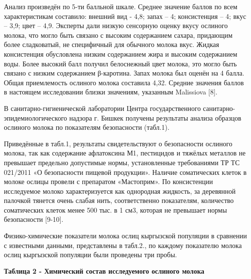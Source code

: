 \begin{multicols}{2}
Анализ произведён по 5-ти балльной шкале. Среднее значение баллов по
всем характеристикам составило: внешний вид - 4,8; запах -- 4;
консистенция -- 4; вкус -- 3,9; цвет -- 4,9. Эксперты дали низкую
сенсорную оценку вкусу ослиного молока, что могло быть связано с высоким
содержанием сахара, придающим более сладковатый, не специфичный для
обычного молока вкус. Жидкая консистенция обусловлена низким содержанием
жира и высоким содержанием воды. Более высокий балл получил белоснежный
цвет молока, это могло быть связано с низким содержанием β-каротина.
Запах молока был оценён на 4 балла. Общая приемлемость ослиного молока
составила 4,32. Средние значения баллов в настоящем исследовании близки
значениям, указанным Malissiova {[}8{]}.

В санитарно-гигиенической лаборатории Центра государственного
санитарно-эпидемиологического надзора г. Бишкек получены результаты
анализа образцов ослиного молока по показателям безопасности (табл.1).

Приведённые в табл.1, результаты свидетельствуют о безопасности ослиного
молока, так как содержание афлатоксина М1, пестицидов и тяжёлых металлов
не превышает предельно допустимые нормы, установленные требованиями ТР
ТС 021/2011 «О безопасности пищевой продукции». Наличие соматических
клеток в молоке ослицы провели с препаратом «Мастоприм». По консистенции
исследуемое молоко характеризуется как однородная жидкость, за
деревянной палочкой тянется очень слабая нить, соответственно
показателям, количество соматических клеток менее 500 тыс. в 1 см3,
которая не превышает нормы безопасности {[}9-10{]}.

Физико-химические показатели молока ослиц кыргызской популяции в
сравнении с известными данными, представлены в табл.2., по каждому
показателю молока ослиц кыргызской популяции были проведены три пробы.
\end{multicols}

{\bfseries Таблица 2 - Химический состав исследуемого ослиного молока}
\begin{table}[H]
\centering
{}
\end{table}

